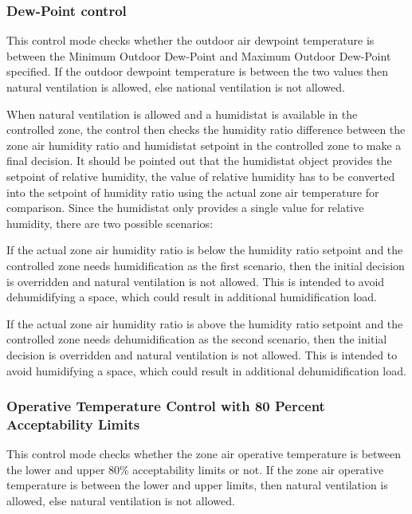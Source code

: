 \subsubsection{Dew-Point control}\label{dew-point-control}

This control mode checks whether the outdoor air dewpoint temperature is between the Minimum Outdoor Dew-Point and Maximum Outdoor Dew-Point specified. If the outdoor dewpoint temperature is between the two values then natural ventilation is allowed, else national ventilation is not allowed.

When natural ventilation is allowed and a humidistat is available in the controlled zone, the control then checks the humidity ratio difference between the zone air humidity ratio and humidistat setpoint in the controlled zone to make a final decision. It should be pointed out that the humidistat object provides the setpoint of relative humidity, the value of relative humidity has to be converted into the setpoint of humidity ratio using the actual zone air temperature for comparison. Since the humidistat only provides a single value for relative humidity, there are two possible scenarios:

If the actual zone air humidity ratio is below the humidity ratio setpoint and the controlled zone needs humidification as the first scenario, then the initial decision is overridden and natural ventilation is not allowed. This is intended to avoid dehumidifying a space, which could result in additional humidification load.

If the actual zone air humidity ratio is above the humidity ratio setpoint and the controlled zone needs dehumidification as the second scenario, then the initial decision is overridden and natural ventilation is not allowed. This is intended to avoid humidifying a space, which could result in additional dehumidification load.

\subsubsection{Operative Temperature Control with 80 Percent Acceptability Limits}\label{operative-temperature-control-with-80-acceptability-limits}

 This control mode checks whether the zone air operative temperature is between the lower and upper 80\% acceptability limits or not. If the zone air operative temperature is between the lower and upper limits, then natural ventilation is allowed, else natural ventilation is not allowed. 

